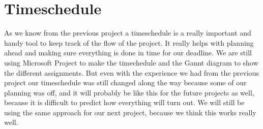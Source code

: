 \section{Timeschedule}
As we know from the previous project a timeschedule is a really important and handy tool to keep track of the flow of the project. It really helps with planning ahead and making sure everything is done in time for our deadline. We are still using Microsoft Project to make the timechedule and the Gannt diagram to show the different assignments. But even with the experience we had from the previous project our timeschedule was still changed along the way because some of our planning was off, and it will probably be like this for the future projects as well, because it is difficult to predict how everything will turn out.
We will still be using the same approach for our next project, because we think this works really well.